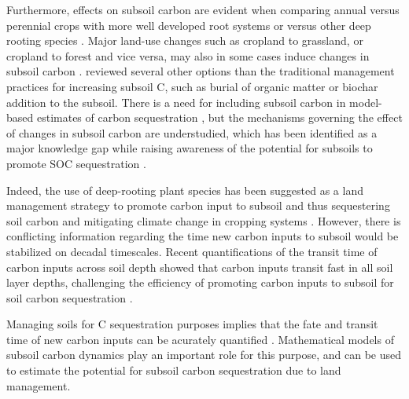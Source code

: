 \documentclass[11pt, oneside, a4paper]{article}   	%
\begin{document}
Furthermore, effects on subsoil carbon are evident when comparing annual versus perennial crops with more well developed root systems or versus other deep rooting species \citep{Carter2010, Collins2010, VandenBygaart2011, Guan2016}. Major land-use changes such as cropland to grassland, or cropland to forest and vice versa, may also in some cases induce changes in subsoil carbon \citep{Guo2002, Poeplau2013}. \citet{Button2022} reviewed several other options than the traditional management practices for increasing subsoil C, such as burial of organic matter or biochar addition to the subsoil. There is a need for including subsoil carbon in model-based estimates of carbon sequestration \citep{Button2022}, but the mechanisms governing the effect of changes in subsoil carbon are understudied, which has been identified as a major knowledge gap \citep{Lorenz2005, Chenu2019} while raising awareness of the potential for subsoils to promote SOC sequestration \citep{Kautz2013, Chen2018}.

Indeed, the use of deep-rooting plant species has been suggested as a land management strategy to promote carbon input to subsoil and thus sequestering soil carbon and mitigating climate change in cropping systems \citep{Kell2011, Thorup2020}. However, there is conflicting information regarding the time new carbon inputs to subsoil would be stabilized on decadal timescales. Recent quantifications of the transit time of carbon inputs across soil depth showed that carbon inputs transit fast in all soil layer depths, challenging the efficiency of promoting carbon inputs to subsoil for soil carbon sequestration \citep{Xiao2022, Wang2023}. 


Managing soils for C sequestration purposes implies that the fate and transit time of new carbon inputs can be acurately quantified \citep{Crow2022}. Mathematical models of subsoil carbon dynamics play an important role for this purpose, and can be used to estimate the potential for subsoil carbon sequestration due to land management. 
\end{document}
